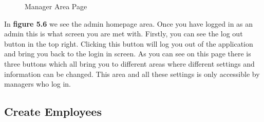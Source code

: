 \begin{figure}[!htb]
    \caption{Manager Area Page}
    \label{fig}
\end{figure}
In \textbf{figure 5.6} we see the admin homepage area. Once you have logged in as an admin this is what screen you are met with. Firstly, you can see the log out button in the top right. Clicking this button will log you out of the application and bring you back to the login in screen. As you can see on this page there is three buttons which all bring you to different areas where different settings and information can be changed. This area and all these settings is only accessible by managers who log in.
\FloatBarrier


\subsection{Create Employees}

